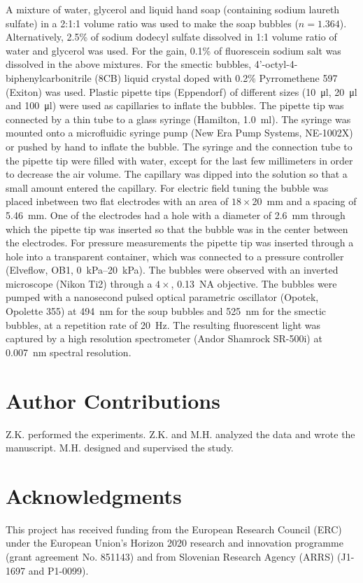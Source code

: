 \documentclass[a4paper,12pt]{article}
\begin{document}
	A mixture of water, glycerol and liquid hand soap (containing sodium laureth sulfate) in a 2:1:1 volume ratio was used to make the soap bubbles ($n=1.364$). Alternatively, 2.5\% of sodium dodecyl sulfate dissolved in 1:1 volume ratio of water and glycerol was used. For the gain, 0.1\% of fluorescein sodium salt was dissolved in the above mixtures. For the smectic bubbles, 4'-octyl-4-biphenylcarbonitrile (8CB) liquid crystal doped with 0.2\% Pyrromethene 597 (Exiton) was used. Plastic pipette tips (Eppendorf) of different sizes (\SI{10}{\micro l}, \SI{20}{\micro l} and \SI{100}{\micro l}) were used as capillaries to inflate the bubbles. The pipette tip was connected by a thin tube to a glass syringe (Hamilton, \SI{1.0}{ml}). The syringe was mounted onto a microfluidic syringe pump (New Era Pump Systems, NE-1002X) or pushed by hand to inflate the bubble. The syringe and the connection tube to the pipette tip were filled with water, except for the last few millimeters in order to decrease the air volume. The capillary was dipped into the solution so that a small amount entered the capillary. For electric field tuning the bubble was placed inbetween two flat electrodes with an area of $18 \times$\SI{20}{mm} and a spacing of \SI{5.46}{mm}. One of the electrodes had a hole with a diameter of \SI{2.6}{mm} through which the pipette tip was inserted so that the bubble was in the center between the electrodes. For pressure measurements the pipette tip was inserted through a hole into a transparent container, which was connected to a pressure controller (Elveflow, OB1, \SIrange{0}{20}{kPa}). The bubbles were observed with an inverted microscope (Nikon Ti2) through a $4\times$, \SI{0.13}{NA} objective. The bubbles were pumped with a nanosecond pulsed optical parametric oscillator (Opotek, Opolette 355) at \SI{494}{nm} for the soup bubbles and \SI{525}{nm} for the smectic bubbles, at a repetition rate of \SI{20}{Hz}. The resulting fluorescent light was captured by a high resolution spectrometer (Andor Shamrock SR-500i) at \SI{0.007}{nm} spectral resolution.
	
	
	\section*{Author Contributions}
	Z.K. performed the experiments. Z.K. and M.H. analyzed the data and wrote the manuscript. M.H. designed and supervised the study.
	
	\section*{Acknowledgments}
	This project has received funding from the European Research Council (ERC) under the European Union’s Horizon 2020 research and innovation programme (grant agreement No. 851143) and from Slovenian Research Agency (ARRS) (J1-1697 and P1-0099).
	
\end{document}
